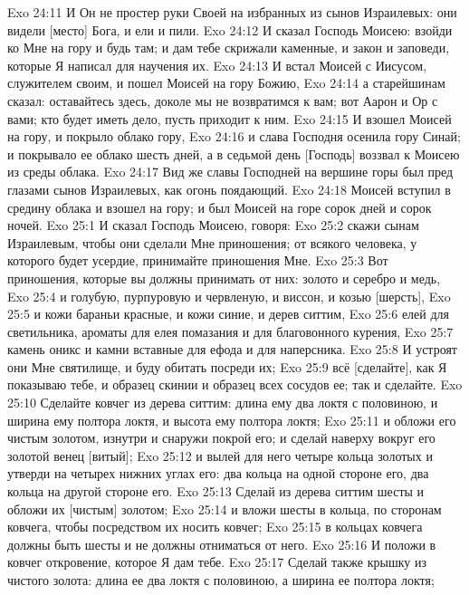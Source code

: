 \vs Exo 24:11 И Он не простер руки Своей на избранных из сынов Израилевых: они видели [место] Бога, и ели и пили.
\rsbpar\vs Exo 24:12 И сказал Господь Моисею: взойди ко Мне на гору и будь там; и дам тебе скрижали каменные, и закон и заповеди, которые Я написал для научения их.
\vs Exo 24:13 И встал Моисей с Иисусом, служителем своим, и пошел Моисей на гору Божию,
\vs Exo 24:14 а старейшинам сказал: оставайтесь здесь, доколе мы не возвратимся к вам; вот Аарон и Ор с вами; кто будет иметь дело, пусть приходит к ним.
\vs Exo 24:15 И взошел Моисей на гору, и покрыло облако гору,
\vs Exo 24:16 и слава Господня осенила гору Синай; и покрывало ее облако шесть дней, а в седьмой день [Господь] воззвал к Моисею из среды облака.
\vs Exo 24:17 Вид же славы Господней на вершине горы был пред глазами сынов Израилевых, как огонь поядающий.
\vs Exo 24:18 Моисей вступил в средину облака и взошел на гору; и был Моисей на горе сорок дней и сорок ночей.
\vs Exo 25:1 И сказал Господь Моисею, говоря:
\vs Exo 25:2 скажи сынам Израилевым, чтобы они сделали Мне приношения; от всякого человека, у которого будет усердие, принимайте приношения Мне.
\rsbpar\vs Exo 25:3 Вот приношения, которые вы должны принимать от них: золото и серебро и медь,
\vs Exo 25:4 и  голубую, пурпуровую и червленую, и виссон, и козью [шерсть],
\vs Exo 25:5 и кожи бараньи красные, и кожи синие, и дерев ситтим,
\vs Exo 25:6 елей для светильника, ароматы для елея помазания и для благовонного курения,
\vs Exo 25:7 камень оникс и камни вставные для ефода и для наперсника.
\vs Exo 25:8 И устроят они Мне святилище, и буду обитать посреди их;
\vs Exo 25:9 всё [сделайте], как Я показываю тебе, и образец скинии и образец всех сосудов ее; так и сделайте.
\rsbpar\vs Exo 25:10 Сделайте ковчег из дерева ситтим: длина ему два локтя с половиною, и ширина ему полтора локтя, и высота ему полтора локтя;
\vs Exo 25:11 и обложи его чистым золотом, изнутри и снаружи покрой его; и сделай наверху вокруг его золотой венец [витый];
\vs Exo 25:12 и вылей для него четыре кольца золотых и утверди на четырех нижних углах его: два кольца на одной стороне его, два кольца на другой стороне его.
\vs Exo 25:13 Сделай из дерева ситтим шесты и обложи их [чистым] золотом;
\vs Exo 25:14 и вложи шесты в кольца, по сторонам ковчега, чтобы посредством их носить ковчег;
\vs Exo 25:15 в кольцах ковчега должны быть шесты и не должны отниматься от него.
\vs Exo 25:16 И положи в ковчег откровение, которое Я дам тебе.
\vs Exo 25:17 Сделай также крышку из чистого золота: длина ее два локтя с половиною, а ширина ее полтора локтя;
